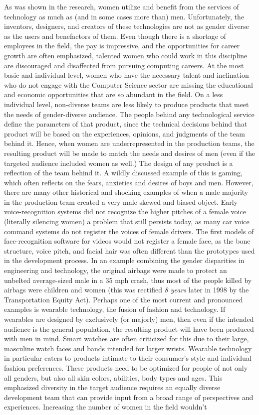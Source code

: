 \documentclass[12pt]{article}
\begin{document}
	
	As was shown in the research, women utilize and benefit from the services of technology as much as (and in some cases more than) men. Unfortunately, the inventors, designers, and creators of these technologies are not as gender diverse as the users and benefactors of them. Even though there is a shortage of employees in the field, the pay is impressive, and the opportunities for career growth are often emphasized, talented women who could work in this discipline are discouraged and disaffected from pursuing computing careers. At the most basic and individual level, women who have the necessary talent and inclination who do not engage with the Computer Science sector are missing the educational and economic opportunities that are so abundant in the field. On a less individual level, non-diverse teams are less likely to produce products that meet the needs of  gender-diverse audience. The people behind any technological service define the parameters of that product, since the technical decisions behind that product will be based on the experiences, opinions, and judgments of the team behind it. Hence, when women are underrepresented in the production teams, the resulting product will be made to match the needs and desires of men (even if the targeted audience included women as well.) The design of any product is a reflection of the team behind it. A wildly discussed example of this is gaming, which often reflects on the fears, anxieties and desires of boys and men. However, there are many other historical and shocking examples of when a male majority in the production team created a very male-skewed and biased object. Early voice-recognition systems did not recognize the higher pitches of a female voice (literally silencing women) a problem that still persists today, as many car voice command systems do not register the voices of female drivers. The first models of face-recognition software for videos would not register a female face, as the bone structure, voice pitch, and facial hair was often different than the prototypes used in the development process. In an example combining the gender disparities in engineering and technology, the original airbags were made to protect an unbelted average-sized male in a 35 mph crash, thus most of the people killed by airbags were children and women (this was rectified \textit{8 years} later in 1998 by the Transportation Equity Act)\cite{airbag}. Perhaps one of the most current and pronounced examples is wearable technology, the fusion of fashion and technology. If wearables are designed by exclusively (or majorly) men, then even if the intended audience is the general population, the resulting product will have been produced with men in mind. Smart watches are often criticized for this due to their large, masculine watch faces and bands intended for larger wrists. Wearable technology in particular caters to products intimate to their consumer's style and individual fashion preferences. These products need to be optimized for people of not only all genders, but also all skin colors, abilities, body types and ages. This emphasized diversity in the target audience requires an equally diverse development team that can provide input from a broad range of perspectives and experiences. Increasing the number of women in the field wouldn't 
\end{document}
